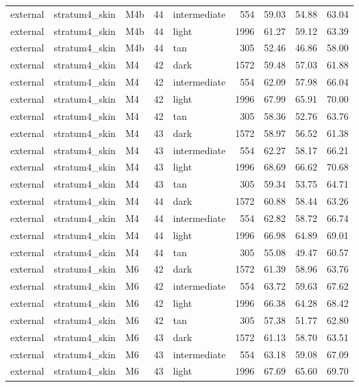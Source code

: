 \begin{tabular}{lllrlrrrr}
external & stratum4\_skin & M4b & 44 & intermediate & 554 & 59.03 & 54.88 & 63.04 \\
external & stratum4\_skin & M4b & 44 & light & 1996 & 61.27 & 59.12 & 63.39 \\
external & stratum4\_skin & M4b & 44 & tan & 305 & 52.46 & 46.86 & 58.00 \\
external & stratum4\_skin & M4 & 42 & dark & 1572 & 59.48 & 57.03 & 61.88 \\
external & stratum4\_skin & M4 & 42 & intermediate & 554 & 62.09 & 57.98 & 66.04 \\
external & stratum4\_skin & M4 & 42 & light & 1996 & 67.99 & 65.91 & 70.00 \\
external & stratum4\_skin & M4 & 42 & tan & 305 & 58.36 & 52.76 & 63.76 \\
external & stratum4\_skin & M4 & 43 & dark & 1572 & 58.97 & 56.52 & 61.38 \\
external & stratum4\_skin & M4 & 43 & intermediate & 554 & 62.27 & 58.17 & 66.21 \\
external & stratum4\_skin & M4 & 43 & light & 1996 & 68.69 & 66.62 & 70.68 \\
external & stratum4\_skin & M4 & 43 & tan & 305 & 59.34 & 53.75 & 64.71 \\
external & stratum4\_skin & M4 & 44 & dark & 1572 & 60.88 & 58.44 & 63.26 \\
external & stratum4\_skin & M4 & 44 & intermediate & 554 & 62.82 & 58.72 & 66.74 \\
external & stratum4\_skin & M4 & 44 & light & 1996 & 66.98 & 64.89 & 69.01 \\
external & stratum4\_skin & M4 & 44 & tan & 305 & 55.08 & 49.47 & 60.57 \\
external & stratum4\_skin & M6 & 42 & dark & 1572 & 61.39 & 58.96 & 63.76 \\
external & stratum4\_skin & M6 & 42 & intermediate & 554 & 63.72 & 59.63 & 67.62 \\
external & stratum4\_skin & M6 & 42 & light & 1996 & 66.38 & 64.28 & 68.42 \\
external & stratum4\_skin & M6 & 42 & tan & 305 & 57.38 & 51.77 & 62.80 \\
external & stratum4\_skin & M6 & 43 & dark & 1572 & 61.13 & 58.70 & 63.51 \\
external & stratum4\_skin & M6 & 43 & intermediate & 554 & 63.18 & 59.08 & 67.09 \\
external & stratum4\_skin & M6 & 43 & light & 1996 & 67.69 & 65.60 & 69.70 \\

\end{tabular}
